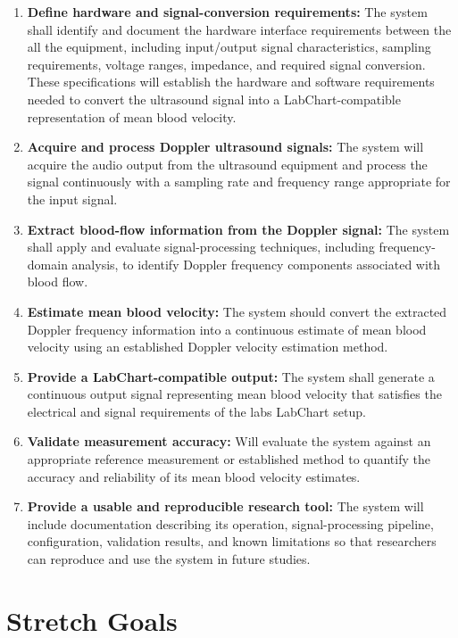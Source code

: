 \documentclass{article}
\begin{document}
\begin{enumerate}
    \item \textbf{Define hardware and signal-conversion requirements:} The system shall identify and document the hardware interface requirements between the all the equipment, including input/output signal characteristics, sampling requirements, voltage ranges, impedance, and required signal conversion. These specifications will establish the hardware and software requirements needed to convert the ultrasound signal into a LabChart-compatible representation of mean blood velocity.
    \item \textbf{Acquire and process Doppler ultrasound signals:} The system will acquire the audio output from the ultrasound equipment and process the signal continuously with a sampling rate and frequency range appropriate for the input signal.
    \item \textbf{Extract blood-flow information from the Doppler signal:} The system shall apply and evaluate signal-processing techniques, including frequency-domain analysis, to identify Doppler frequency components associated with blood flow.
    \item \textbf{Estimate mean blood velocity:} The system should convert the extracted Doppler frequency information into a continuous estimate of mean blood velocity using an established Doppler velocity estimation method.
    \item \textbf{Provide a LabChart-compatible output:} The system shall generate a continuous output signal representing mean blood velocity that satisfies the electrical and signal requirements of the labs LabChart setup.
    \item \textbf{Validate measurement accuracy:} Will evaluate the system against an appropriate reference measurement or established method to quantify the accuracy and reliability of its mean blood velocity estimates.
    \item \textbf{Provide a usable and reproducible research tool:} The system will include documentation describing its operation, signal-processing pipeline, configuration, validation results, and known limitations so that researchers can reproduce and use the system in future studies.
\end{enumerate}

\section{Stretch Goals}
\end{document}
